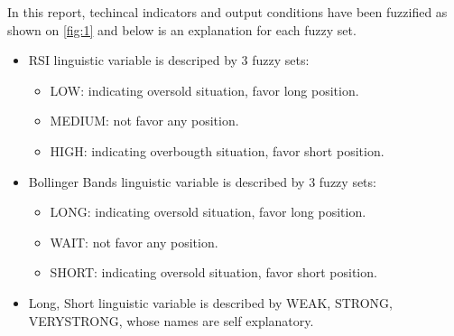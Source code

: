 \documentclass{article}
\begin{document}
In this report, techincal indicators and output conditions have been fuzzified as shown on \cref*{fig:1} and below is an explanation 
for each fuzzy set.
\begin{itemize}
    \item {RSI linguistic variable is descriped by 3 fuzzy sets:
    \begin{itemize} 
        \item LOW: indicating oversold situation, favor long position.
        \item MEDIUM: not favor any position.
        \item HIGH: indicating overbougth situation, favor short position.
    \end{itemize}
    }
    \item {Bollinger Bands linguistic variable is described by 3 fuzzy sets:
    \begin{itemize} 
        \item LONG: indicating oversold situation, favor long position.
        \item WAIT: not favor any position.
        \item SHORT: indicating oversold situation, favor short position. 
    \end{itemize}
    }
    \item {Long, Short linguistic variable is described by WEAK, STRONG, VERYSTRONG, whose names are self explanatory.}
\end{itemize}
\end{document}
